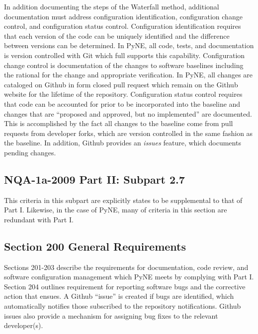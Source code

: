 \documentclass{anstrans}
\begin{document}
In addition documenting the steps of the Waterfall method, additional
documentation must address configuration identification, configuration change
control, and configuration status control. Configuration identification
requires that each version of the code can be uniquely identified and the
difference between versions can be determined. In PyNE, all code, tests, and
documentation is version controlled with Git which full supports this
capability. Configuration change control is documentation of the changes to
software baselines including the rational for the change and appropriate
verification. In PyNE, all changes are cataloged on Github in form closed pull
request which remain on the Github website for the lifetime of the repository.
Configuration status control requires that code can be accounted for prior to
be incorporated into the baseline and changes that are ``proposed and approved,
but no implemented'' are documented. This is accomplished by the fact all
changes to the baseline come from pull requests from developer forks, which are
version controlled in the same fashion as the baseline. In addition, Github
provides an \emph{issues} feature, which documents pending changes.


\subsection{NQA-1a-2009 Part II: Subpart 2.7}

This criteria in this subpart are explicitly states to be supplemental to that
of Part I. Likewise, in the case of PyNE, many of criteria in this section are
redundant with Part I.

\subsection{Section 200 General Requirements}

Sections 201-203 describe the requirements for documentation, code review, and
software configuration management which PyNE meets by complying with Part I.
Section 204 outlines requirement for reporting software bugs and the corrective
action that ensues. A Github ``issue'' is created if bugs are identified, which
automatically notifies those subscribed to the repository notifications. Github
issues also provide a mechanism for assigning bug fixes to the relevant
developer(s). 

\end{document}
